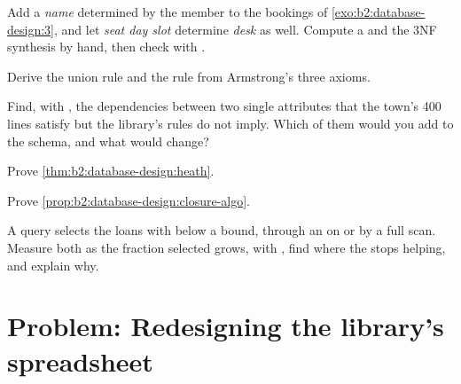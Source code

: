 \begin{exercise}[$\star\star$]\label{exo:b2:database-design:7}
Add a \emph{name} determined by the member to the bookings of \cref{exo:b2:database-design:3}, and let \emph{seat day
slot} determine \emph{desk} as well. Compute a  and the 3NF synthesis by hand, then check with
.
\end{exercise}

\begin{exercise}[$\star\star$]\label{exo:b2:database-design:8}
Derive the union rule and the  rule from Armstrong's three axioms.
\end{exercise}

\begin{exercise}[$\star\star$]\label{exo:b2:database-design:9}
Find, with , the dependencies between two single attributes that the town's 400 lines satisfy
but the library's rules do not imply. Which of them would you add to the schema, and what would change?
\end{exercise}

\begin{exercise}[$\star\star\star$]\label{exo:b2:database-design:10}
Prove \cref{thm:b2:database-design:heath}.
\end{exercise}

\begin{exercise}[$\star\star\star$]\label{exo:b2:database-design:11}
Prove \cref{prop:b2:database-design:closure-algo}.
\end{exercise}

\begin{exercise}[$\star\star\star$]\label{exo:b2:database-design:12}
A query selects the loans with  below a bound, through an  on  or by a full scan.
Measure both as the fraction selected grows, with , find where the  stops helping, and
explain why.
\end{exercise}

\section{Problem: Redesigning the library's spreadsheet}\label{sec:b2:database-design:problem}

